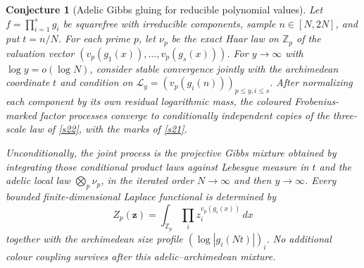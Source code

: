 \documentclass[11pt]{article}
\newtheorem{conjecture}{Conjecture}
\theoremstyle{definition}
\newcommand{\Z}{\mathbb Z}
\providecommand{\Z}{\mathbb Z}
\begin{document}
\begin{conjecture}[Adelic Gibbs gluing for reducible polynomial values]\label{s23}
Let $f=\prod_{i=1}^s g_i$ be squarefree with irreducible components, sample
$n\in[N,2N]$, and put $t=n/N$.  For each prime $p$, let $\nu_p$ be the exact Haar law on
$\Z_p$ of the valuation vector
$(v_p(g_1(x)),\ldots,v_p(g_s(x)))$.  For
$y\to\infty$ with $\log y=o(\log N)$, consider stable convergence jointly with the
archimedean coordinate $t$ and condition on
$\mathscr L_y=(v_p(g_i(n)))_{p\le y,i\le s}$.  After normalizing each component by its
own residual logarithmic mass, the coloured Frobenius-marked factor processes converge
to conditionally independent copies of the three-scale law of \cref{s22}, with the
marks of \cref{s21}.

Unconditionally, the joint process is the projective Gibbs mixture obtained by
integrating those conditional product laws against Lebesgue measure in $t$ and the
adelic local law $\bigotimes_p\nu_p$, in the iterated order $N\to\infty$ and then
$y\to\infty$.  Every bounded finite-dimensional Laplace functional is determined by
\[
 Z_p(\mathbf z)=\int_{\Z_p}\prod_i z_i^{v_p(g_i(x))}\,dx
\]
together with the archimedean size profile $(\log|g_i(Nt)|)_i$.  No additional colour
coupling survives after this adelic--archimedean mixture.
\end{conjecture}
\end{document}
